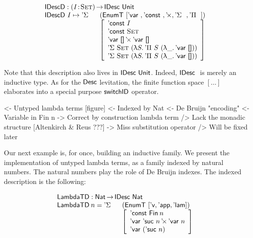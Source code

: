\[\stk{
\IDescD : \PI{\V{I}}{\Set} \IDesc{\Unit} \\
\begin{array}{@{}ll}
\IDescD~I \mapsto \DSigma{}{} & (\EnumT [ \DVar{},
                                          \DConst{},
                                          \DProd{}{},
                                          \DSigma{}{}, 
                                          \DPi{}{} ]) \\
                              & \left[\begin{array}{l}
                                      \DConst{I}                  \\
                                      \DConst{\Set}               \\
                                      \DProd{\DVar{\Void}}{\DVar{\Void}}  \\
                                      \DSigma{\Set}{(\LAM{S} \DPi{S}{(\LAM{\_} \DVar{\Void})})} \\
                                      \DSigma{\Set}{(\LAM{S} \DPi{S}{(\LAM{\_} \DVar{\Void})})}
                                   \end{array}
                             \right]
\end{array}
}\]

Note that this description also lives in $\IDesc{\Unit}$. Indeed,
$\IDesc$ is merely an inductive type. As for the $\Desc$ levitation,
the finite function space $[ \ldots ]$ elaborates into a special
purpose $\F{switchID}$ operator. 

\begin{wstructure}
<- Untyped lambda terms [figure]
    <- Indexed by Nat
        <- De Bruijn "encoding"
    <- Variable in Fin n
        -> Correct by construction lambda term
    /> Lack the monadic structure [Altenkirch & Reus ???]
        -> Miss substitution operator
        /> Will be fixed later
\end{wstructure}

Our next example is, for once, building an inductive family. We
present the implementation of untyped lambda terms, as a family
indexed by natural numbers. The natural numbers play the role of De
Bruijn indexes. The indexed description is the following:

\[\stk{
\LambdaTD : \Nat \To \IDesc{\Nat} \\
\begin{array}{@{}ll}
\LambdaTD\: n = \DSigma{}{} & (\EnumT [ \LambdaTVar, \LambdaTApp, \LambdaTLam ]) \\
                            & \left[\begin{array}{l}
                                  \DConst{\Fin{n}} \\
                                  \DProd{\DVar{\NatSuc{n}}}{\DVar{n}} \\
                                  \DVar{(\NatSuc{n})}
                              \end{array}\right]
\end{array}
}\]

